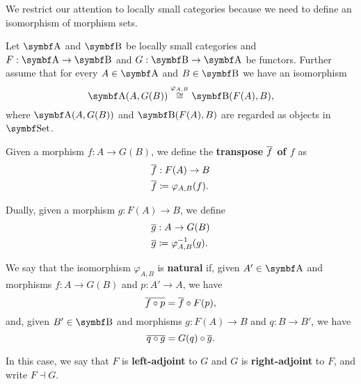 \begin{note}
  We restrict our attention to locally small categories because we need to define an isomorphism of morphism sets.
\end{note}
\begin{definition}\label{def:adjoint_functor}\cite[definition 2.1.1]{Leinster2014}
  Let \( \Bold A \) and \( \Bold B \) be locally small categories and \( F: \Bold A \to \Bold B \) and \( G: \Bold B \to \Bold A \) be functors. Further assume that for every \( A \in \Bold A \) and \( B \in \Bold B \) we have an isomorphism
  \begin{equation*}
    \Bold{A}(A, G(B)) \overset {\varphi_{A, B}} {\cong} \Bold{B}(F(A), B),
  \end{equation*}
  where \( \Bold{A}(A, G(B)) \) and \( \Bold{B}(F(A), B) \) are regarded as objects in \( \Bold{Set} \).

  Given a morphism \( f: A \to G(B) \), we define the \textbf{transpose \( \overline{f} \) of \( f \)} as
  \begin{align*}
    &\overline{f}: F(A) \to B \\
    &\overline{f} \coloneqq \varphi_{A, B} (f).
  \end{align*}

  Dually, given a morphism \( g: F(A) \to B \), we define
  \begin{align*}
    &\overline{g}: A \to G(B) \\
    &\overline{g} \coloneqq \varphi_{A, B}^{-1} (g).
  \end{align*}

  We say that the isomorphism \( \varphi_{A, B} \) is \textbf{natural} if,  given \( A' \in \Bold A \) and morphisms \( f: A \to G(B) \) and \( p: A' \to A \), we have
  \begin{equation*}
    \overline{f \circ p} = \overline{f} \circ F(p),
  \end{equation*}
  and, given \( B' \in \Bold B \) and morphisms \( g: F(A) \to B \) and \( q: B \to B' \), we have
  \begin{equation*}
    \overline{q \circ g} = G(q) \circ \overline{g}.
  \end{equation*}

  In this case, we say that \( F \) is \textbf{left-adjoint} to \( G \) and \( G \) is \textbf{right-adjoint} to \( F \), and write \( F \dashv G \).
\end{definition}


